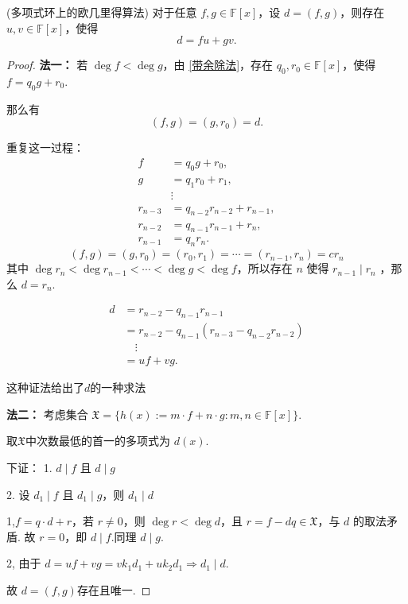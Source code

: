 \begin{proposition}(多项式环上的欧几里得算法)\label{多项式环上的欧几里得算法}
对于任意 \( f, g \in \mathbb{F}[x] \)，设 \( d = (f, g) \)，则存在 \( u, v \in \mathbb{F}[x] \)，使得
	\[ d = fu + gv. \]
\end{proposition}
\begin{proof}
\textbf{法一：}
若 \( \deg f < \deg g \)，由 \ref{带余除法}，存在 \( q_0, r_0 \in \mathbb{F}[x] \)，使得 \( f = q_0 g + r_0 \).
		
		那么有
		\[ (f, g) = (g, r_0)=d. \]
		
		重复这一过程：
		\[
		\begin{aligned}
			f &= q_0 g + r_0, \\
			g &= q_1 r_0 + r_1, \\
			&\vdots \\
			r_{n-3} &= q_{n-2} r_{n-2} + r_{n-1}, \\
			r_{n-2} &= q_{n-1} r_{n-1} + r_n, \\
			r_{n-1} &= q_n r_n.
		\end{aligned}
		\]
		\[(f,g)=(g,r_0)=(r_0,r_1)=\cdots=(r_{n-1},r_n)=cr_n\]
		其中 \( \deg r_n < \deg r_{n-1} < \cdots < \deg g <\deg f\)，所以存在 \( n \) 使得 \( r_{n-1}\mid r_n\) ，那么 \( d = r_n \).

		\[
		\begin{aligned}
			d &= r_{n-2} - q_{n-1} r_{n-1} \\
			&= r_{n-2} - q_{n-1}(r_{n-3} - q_{n-2} r_{n-2}) \\
			&\quad \vdots \\
			&= uf + vg.
		\end{aligned}
		\]
		
		这种证法给出了$d$的一种求法

\textbf{法二：} 考虑集合 \( \mathfrak{X} = \{ h(x) := m \cdot f + n \cdot g : m, n \in \mathbb{F}[x] \} \).

取$\mathfrak{X}$中次数最低的首一的多项式为 \( d(x) \).

下证：
1. \( d \mid f \) 且 \( d \mid g \)

2. 设 \( d_1 \mid f \) 且 \( d_1 \mid g \)，则 \( d_1 \mid d \)


1,\( f = q \cdot d + r \)，若 \( r \neq 0 \)，则 \( \deg r < \deg d \)，且 \( r = f - dq \in \mathfrak{X} \)，与 \( d \) 的取法矛盾.
故 \( r = 0 \)，即 \( d \mid f \).同理 \( d \mid g \).

2, 由于 \( d = uf + vg = vk_1 d_1 + uk_2 d_1 \Rightarrow d_1 \mid d \).

故 \( d = (f, g) \)存在且唯一.
\end{proof}
